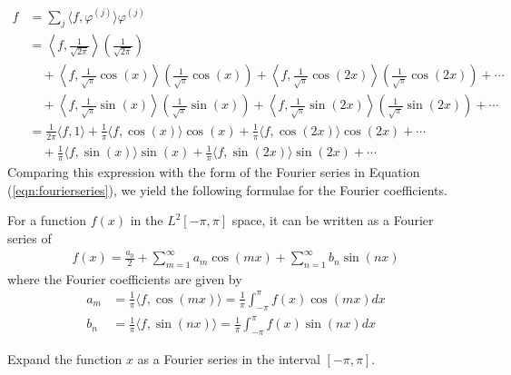 \begin{align*}
f &= \sum_{j} \langle f, \varphi^{(j)} \rangle \varphi^{(j)} \\ 
&= \left\langle f, \frac{1}{\sqrt{2\pi}} \right\rangle \left(\frac{1}{\sqrt{2\pi}}\right)\\
&\quad + \left\langle f, \frac{1}{\sqrt{\pi}}\cos(x) \right\rangle \left(\frac{1}{\sqrt{\pi}}\cos(x)\right) + \left\langle f, \frac{1}{\sqrt{\pi}}\cos(2x) \right\rangle \left(\frac{1}{\sqrt{\pi}}\cos(2x)\right) + \cdots \\
&\quad + \left\langle f, \frac{1}{\sqrt{\pi}}\sin(x) \right\rangle \left(\frac{1}{\sqrt{\pi}}\sin(x)\right) + \left\langle f, \frac{1}{\sqrt{\pi}}\sin(2x) \right\rangle \left(\frac{1}{\sqrt{\pi}}\sin(2x)\right) + \cdots \\
&= \frac{1}{2\pi} \langle f, 1 \rangle + \frac{1}{\pi} \langle f, \cos(x) \rangle \cos(x) + \frac{1}{\pi} \langle f, \cos(2x) \rangle \cos(2x) + \cdots \\
&\quad + \frac{1}{\pi}\langle f, \sin(x) \rangle \sin(x) + \frac{1}{\pi}\langle f, \sin(2x) \rangle \sin(2x) + \cdots
\end{align*}
Comparing this expression with the form of the Fourier series in Equation (\ref{eqn:fourierseries}), we yield the following formulae for the Fourier coefficients.
\begin{proper}
\label{proper:fourierseries}
For a function $f(x)$ in the $L^2[-\pi, \pi]$ space, it can be written as a Fourier series of
\begin{align}
f(x) = \frac{a_0}{2} + \sum_{m=1}^{\infty} a_m \cos(mx) + \sum_{n=1}^{\infty} b_n \sin(nx) \label{eqn:fourierseri}
\end{align}
where the Fourier coefficients are given by
\begin{subequations}
\begin{align}
a_m &= \frac{1}{\pi}\langle f, \cos(mx) \rangle = \frac{1}{\pi} \int_{-\pi}^{\pi} f(x)\cos(mx) dx \label{eqn:fouriera} \\
b_n &= \frac{1}{\pi}\langle f, \sin(nx) \rangle = \frac{1}{\pi} \int_{-\pi}^{\pi} f(x)\sin(nx) dx \label{eqn:fourierb}
\end{align}    
\end{subequations}
\end{proper}
\begin{exmp}
\label{exmp:fourierx}
Expand the function $x$ as a Fourier series in the interval $[-\pi, \pi]$.
\end{exmp}

